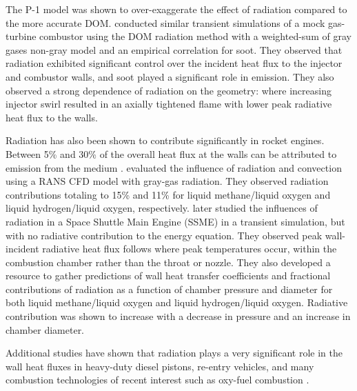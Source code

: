 The P-1 model was shown to over-exaggerate the effect of radiation compared to the more accurate DOM.
\citet{Ghose2016PredictionLevels} conducted similar transient simulations of a mock gas-turbine combustor using the DOM radiation method with a weighted-sum of gray gases non-gray model and an empirical correlation for soot. They observed that radiation exhibited significant control over the incident heat flux to the injector and combustor walls, and soot played a significant role in emission. They also observed a strong dependence of radiation on the geometry: where increasing injector swirl resulted in an axially tightened flame with lower peak radiative heat flux to the walls.



Radiation has also been shown to contribute significantly in rocket engines. Between 5\% and 30\% of the overall heat flux at the walls can be attributed to emission from the medium \cite{Sutton2001RocketElements,Naraghi2005ModelingEngines,Pizzarelli2021OverviewChambers}. \citet{Leccese2018ConvectiveChambers} evaluated the influence of radiation and convection using a RANS CFD model with gray-gas radiation. 
They observed radiation contributions totaling to 15\% and 11\% for liquid methane/liquid oxygen and liquid hydrogen/liquid oxygen, respectively.
\citet{Leccese2019NumericalChambers} later studied the influences of radiation in a Space Shuttle Main Engine (SSME) in a transient simulation, but with no radiative contribution to the energy equation.
They observed peak wall-incident radiative heat flux follows where peak temperatures occur, within the combustion chamber rather than the throat or nozzle. They also developed a resource to gather predictions of wall heat transfer coefficients and fractional contributions of radiation as a function of chamber pressure and diameter for both liquid methane/liquid oxygen and liquid hydrogen/liquid oxygen.
Radiative contribution was shown to increase with a decrease in pressure and an increase in chamber diameter.

Additional studies have shown that radiation plays a very significant role in the wall heat fluxes in heavy-duty diesel pistons, re-entry vehicles, and many combustion technologies of recent interest such as oxy-fuel combustion \cite{Modest2016RadiativeSystems,Viskanta1987RadiationSystems}.



